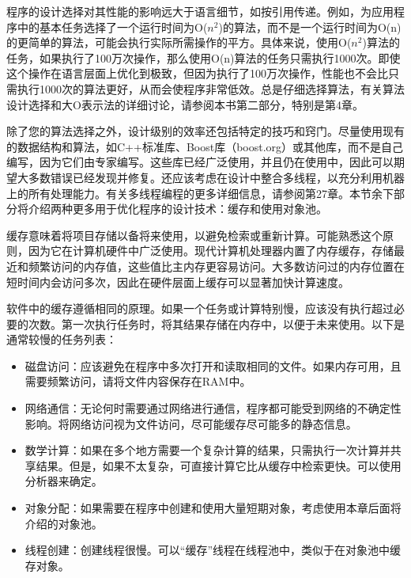 
程序的设计选择对其性能的影响远大于语言细节，如按引用传递。例如，为应用程序中的基本任务选择了一个运行时间为O($n^2$)的算法，而不是一个运行时间为O(n)的更简单的算法，可能会执行实际所需操作的平方。具体来说，使用O($n^2$)算法的任务，如果执行了100万次操作，那么使用O(n)算法的任务只需执行1000次。即使这个操作在语言层面上优化到极致，但因为执行了100万次操作，性能也不会比只需执行1000次的算法更好，从而会使程序非常低效。总是仔细选择算法，有关算法设计选择和大O表示法的详细讨论，请参阅本书第二部分，特别是第4章。

除了您的算法选择之外，设计级别的效率还包括特定的技巧和窍门。尽量使用现有的数据结构和算法，如C++标准库、Boost库（boost.org）或其他库，而不是自己编写，因为它们由专家编写。这些库已经广泛使用，并且仍在使用中，因此可以期望大多数错误已经发现并修复。还应该考虑在设计中整合多线程，以充分利用机器上的所有处理能力。有关多线程编程的更多详细信息，请参阅第27章。本节余下部分将介绍两种更多用于优化程序的设计技术：缓存和使用对象池。


缓存意味着将项目存储以备将来使用，以避免检索或重新计算。可能熟悉这个原则，因为它在计算机硬件中广泛使用。现代计算机处理器内置了内存缓存，存储最近和频繁访问的内存值，这些值比主内存更容易访问。大多数访问过的内存位置在短时间内会访问多次，因此在硬件层面上缓存可以显著加快计算速度。

软件中的缓存遵循相同的原理。如果一个任务或计算特别慢，应该没有执行超过必要的次数。第一次执行任务时，将其结果存储在内存中，以便于未来使用。以下是通常较慢的任务列表：

\begin{itemize}
\item
磁盘访问：应该避免在程序中多次打开和读取相同的文件。如果内存可用，且需要频繁访问，请将文件内容保存在RAM中。

\item
网络通信：无论何时需要通过网络进行通信，程序都可能受到网络的不确定性影响。将网络访问视为文件访问，尽可能缓存尽可能多的静态信息。

\item
数学计算：如果在多个地方需要一个复杂计算的结果，只需执行一次计算并共享结果。但是，如果不太复杂，可直接计算它比从缓存中检索更快。可以使用分析器来确定。

\item
对象分配：如果需要在程序中创建和使用大量短期对象，考虑使用本章后面将介绍的对象池。

\item
线程创建：创建线程很慢。可以“缓存”线程在线程池中，类似于在对象池中缓存对象。
\end{itemize}

